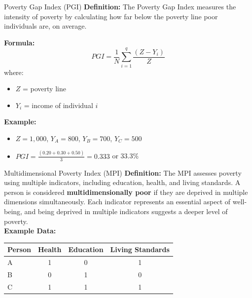 \documentclass{beamer}
\begin{document}
\begin{frame}{Poverty Gap Index (PGI)}
    \textbf{Definition:} The Poverty Gap Index measures the intensity of poverty by calculating how far below the poverty line poor individuals are, on average.
    
    \textbf{Formula:}
    \begin{equation}
        PGI = \frac{1}{N} \sum_{i=1}^{q} \frac{(Z - Y_i)}{Z}
    \end{equation}
    where:
    \begin{itemize}
        \item \( Z \) = poverty line
        \item \( Y_i \) = income of individual \( i \)
    \end{itemize}
    \textbf{Example:}
    \begin{itemize}
        \item \( Z = 1,000 \), \( Y_A = 800 \), \( Y_B = 700 \), \( Y_C = 500 \)
        \item \( PGI = \frac{(0.20 + 0.30 + 0.50)}{3} = 0.333 \) or 33.3\%
    \end{itemize}
\end{frame}

\begin{frame}{Multidimensional Poverty Index (MPI)}
    \textbf{Definition:} The MPI assesses poverty using multiple indicators, including education, health, and living standards. A person is considered \textbf{multidimensionally poor} if they are deprived in multiple dimensions simultaneously. Each indicator represents an essential aspect of well-being, and being deprived in multiple indicators suggests a deeper level of poverty.\\
    \textbf{Example Data:}
    \begin{table}[]
        \centering
        \begin{tabular}{lccc}
        \toprule
        \textbf{Person} & \textbf{Health} & \textbf{Education} & \textbf{Living Standards} \\
        \midrule
        A & 1 & 0 & 1 \\
        B & 0 & 1 & 0 \\
        C & 1 & 1 & 1 \\
        \bottomrule
        \end{tabular}
    \end{table}

\end{frame}
\end{document}
